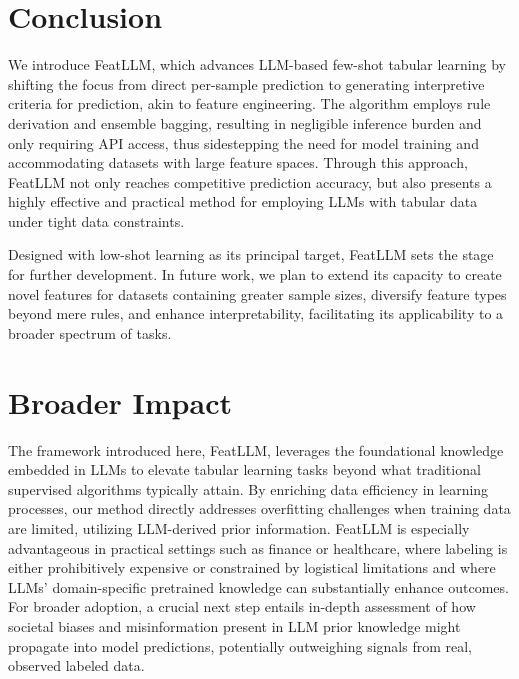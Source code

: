 \section{Conclusion}
We introduce \textsf{FeatLLM}, which advances LLM-based few-shot tabular learning by shifting the focus from direct per-sample prediction to generating interpretive criteria for prediction, akin to feature engineering. The algorithm employs rule derivation and ensemble bagging, resulting in negligible inference burden and only requiring API access, thus sidestepping the need for model training and accommodating datasets with large feature spaces. Through this approach, \textsf{FeatLLM} not only reaches competitive prediction accuracy, but also presents a highly effective and practical method for employing LLMs with tabular data under tight data constraints.

Designed with low-shot learning as its principal target, \textsf{FeatLLM} sets the stage for further development. In future work, we plan to extend its capacity to create novel features for datasets containing greater sample sizes, diversify feature types beyond mere rules, and enhance interpretability, facilitating its applicability to a broader spectrum of tasks.

\section{Broader Impact} The framework introduced here, \textsf{FeatLLM}, leverages the foundational knowledge embedded in LLMs to elevate tabular learning tasks beyond what traditional supervised algorithms typically attain. By enriching data efficiency in learning processes, our method directly addresses overfitting challenges when training data are limited, utilizing LLM-derived prior information. \textsf{FeatLLM} is especially advantageous in practical settings such as finance or healthcare, where labeling is either prohibitively expensive or constrained by logistical limitations and where LLMs' domain-specific pretrained knowledge can substantially enhance outcomes. For broader adoption, a crucial next step entails in-depth assessment of how societal biases and misinformation present in LLM prior knowledge might propagate into model predictions, potentially outweighing signals from real, observed labeled data.

